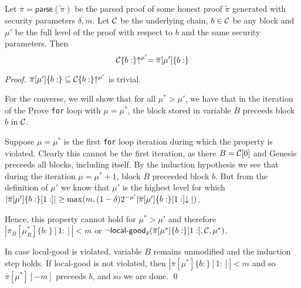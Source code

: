 \begin{lemma}\label{lem:allblocks}
Let $\overline\pi = \textsf{parse}(\tilde\pi)$ be the parsed proof of some
honest proof $\tilde\pi$ generated with security parameters $\delta, m$. Let
$\mathcal{C}$ be the underlying chain, $b \in \mathcal{C}$ be any block and $\mu'$ be the
full level of the proof with respect to $b$ and the same security parameters.
Then
\begin{equation*}
\mathcal{C}\{b:\}\negthickspace\uparrow^{\mu'} = \overline\pi[\mu']\{b:\}
\end{equation*}
\end{lemma}
\begin{proof}
    $\overline\pi[\mu']\{b:\} \subseteq \mathcal{C}\{b:\}\negthickspace\uparrow^{\mu'}$ is trivial.

    For the converse, we will show that for all $\mu^* > \mu'$, we have that in
    the iteration of the Prove \texttt{for} loop with $\mu = \mu^*$, the block stored
    in variable $B$ preceeds block $b$ in $\mathcal{C}$.

    Suppose $\mu = \mu^*$ is the first \texttt{for} loop iteration during which the
    property is violated. Clearly this cannot be the first iteration, as there
    $B = \mathcal{C}[0]$ and Genesis preceeds all blocks, including itself. By the
    induction hypothesis we see that during the iteration $\mu = \mu^* + 1$,
    block $B$ preceeded block $b$. But from the definition of $\mu'$ we know
    that $\mu'$ is the highest level for which
    $|\overline\pi[\mu']\{b:\}[1:]|
    \geq \max(m, (1 -
    \delta)2^{-\mu'}|\overline\pi[\mu']\{b:\}[1:]\negthickspace\downarrow|)$.

    Hence, this
    property cannot hold for $\mu^* > \mu'$ and therefore
    $|\overline\pi_B[\mu_B^*]\{b:\}[1:]| < m$ or
    $\lnot \textsf{local-good}_\delta(\overline\pi[\mu^*]\{b:\}[1:], \mathcal{C}, \mu^*)$.

    In case \textsf{local-good} is violated, variable $B$ remains unmodified and
    the induction step holds. If \textsf{local-good} is not violated, then
    $|\overline\pi[\mu^*]\{b:\}[1:]| < m$ and so $\overline\pi[\mu^*][-m]$
    preceeds $b$, and so we are done.
    \qed
\end{proof}

